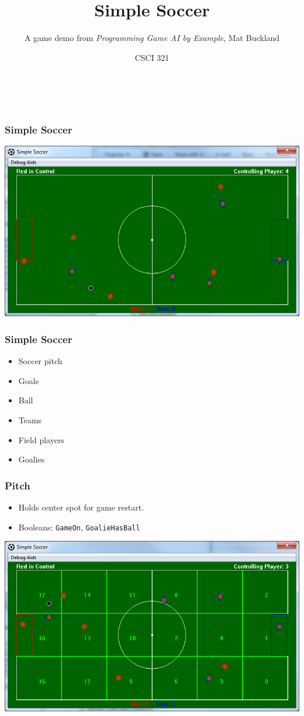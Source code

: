 \documentclass[handout,t,compress]{beamer}
\title{Simple Soccer}
\subtitle{A game demo from {\em Programming Game AI by Example}, Mat Buckland}
\author{CSCI 321}
\institute{WWU}
\newcommand{\bframe}[1]{\begin{frame}[fragile]\frametitle{{#1}}}
\begin{document}
\small

\bframe{~}
\titlepage
\end{frame}

\bframe{Simple Soccer}
\includegraphics[scale=0.4]{simplesoccergame.png}
\end{frame}

\bframe{Simple Soccer}
\begin{itemize}
\item Soccer pitch
\item Goals
\item Ball
\item Teams
\item Field players
\item Goalies
\end{itemize}
\end{frame}

\bframe{Pitch}
\begin{itemize}
\item  Holds center spot for game restart.
\item Booleans:  {\tt GameOn}, {\tt GoalieHasBall}
\end{itemize}
\includegraphics[scale=0.4]{simplesoccerregions.png}
\end{frame}
\end{document}
